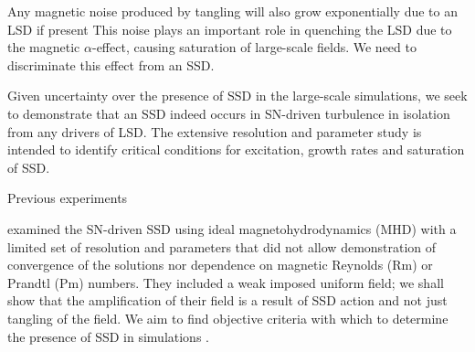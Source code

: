 \documentclass[preprint2]{aastex63}
\begin{document}
 Any magnetic noise produced by tangling will also grow exponentially due to
 an LSD if present
 This noise plays an important role in quenching the LSD due to the magnetic
 $\alpha$-effect, causing saturation of large-scale fields.
 We need to discriminate this effect from an SSD.   

 Given uncertainty over the presence of SSD in the large-scale simulations,
 we seek to demonstrate that an SSD indeed occurs in SN-driven turbulence
 in isolation from any drivers of LSD.
 The extensive resolution and parameter study is intended to identify critical
 conditions for excitation, growth rates and saturation of SSD.
%

 Previous experiments \citep[e.g.,][]{BKMM04,BalKim05,MacLow:2005}

 examined the SN-driven SSD using ideal magnetohydrodynamics (MHD) with
 a limited set of resolution and parameters that did not allow
 demonstration of convergence of the solutions nor dependence on
 magnetic Reynolds (Rm) or Prandtl (Pm) numbers.
 They included a weak imposed uniform field; we shall show
 that the amplification of their field is a result
 of SSD action and not just tangling of the field.
 We aim to find objective criteria with which to determine the presence of SSD
 in simulations \citep[such as][]{Gent:2013b,GE20}.
\end{document}
